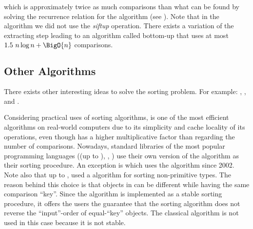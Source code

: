 which is approximately twice as much comparisons than what can be found by
solving the recurrence relation for the \mergesort algorithm (see
\citet*{OEIS:A001855}). Note that in the \heapsort algorithm we did not use the
\emph{siftup} operation. There exists \cite{wegener:1993} a variation of the
extracting step leading to an algorithm called bottom-up \heapsort that uses at
most \(1.5~n \log n + \BigO{n}\) comparisons.

\subsection*{Other Algorithms}

There exists other interesting ideas to solve the sorting problem. For
example: \shellsort \cite{shell:1959}, \smoothsort \cite{dijkstra:1982},
\introsort \cite{musser:1997} and \timsort \cite{martelli:2006}.

Considering practical uses of sorting algorithms, \quicksort is one of the most
efficient algorithms on real-world computers due to its simplicity and cache
locality of its operations, even though \quicksort has a higher
multiplicative factor than \mergesort regarding the number of
comparisons. Nowadays, standard libraries of the most
popular programming languages (\Java (up to ), \CC, \CXX) use their own
version of the \quicksort algorithm as their sorting procedure. An exception is
\Python which uses the \timsort algorithm since 2002. Note also that up to , \Java used a \mergesort algorithm for sorting non-primitive types. The
reason behind this choice is that objects in \Java can be different while
having the same comparison ``key''. Since the \Java \mergesort algorithm is
implemented as a stable sorting procedure, it offers the users the guarantee
that the sorting algorithm does not reverse the ``input''-order of equal-``key'' objects.
The classical \quicksort algorithm is not used in this case because it is not
stable.

